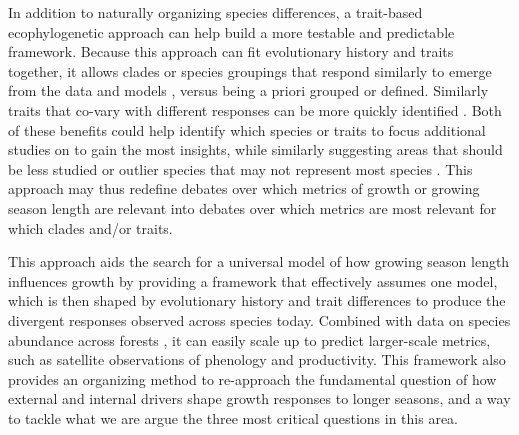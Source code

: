 \documentclass[11pt]{article}
\begin{document}
In addition to naturally organizing species differences, a trait-based ecophylogenetic approach can help build a more testable and predictable framework. %
Because this approach can fit evolutionary history and traits together, it allows clades or species groupings that respond similarly to emerge from the data and models \citep{davies2019phylogenetically}, versus being a priori grouped or defined. Similarly traits that co-vary with different responses can be more quickly identified \citep[e.g.,][]{willis2008phylogenetic,davies2019phylogenetically}. Both of these benefits could help identify which species or traits to focus additional studies on to gain the most insights, while similarly suggesting areas that should be less studied \citep[e.g., traits that may be too confounded with evolutionary history,][]{cornwell2014functional,westoby2023phylogenetically} or outlier species that may not represent most species \citep{morales2024phylogenetic}. This approach may thus redefine debates over which metrics of growth or growing season length are relevant into debates over which metrics are most relevant for which clades and/or traits. %

This approach aids the search for a universal model of how growing season length influences growth by providing a framework that effectively assumes one model, which is then shaped by evolutionary history and trait differences to produce the divergent responses observed across species today. Combined with data on species abundance across forests \citep[e.g.][]{FIA,fischer2019swiss}, it can easily scale up to predict larger-scale metrics, such as satellite observations of phenology and productivity.
This framework also provides an organizing method to re-approach the fundamental question of how external and internal drivers shape growth responses to longer seasons, and a way to tackle what we are argue the three most critical questions in this area. 

\end{document}

